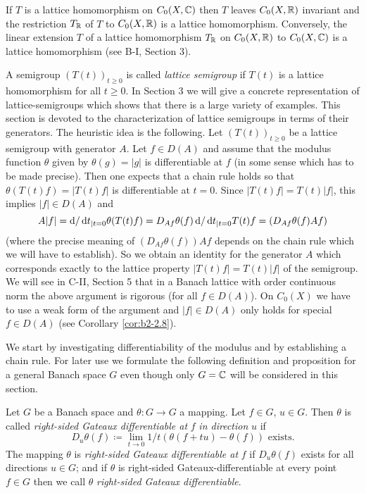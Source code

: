 \begin{remark}\label{rem:b2-2.1}
If $T$ is a lattice homomorphism on $C_{0}(X,\mathbb{C})$ then $T$ leaves $C_{0}(X,\mathbb{R})$ invariant and the restriction $T_{\mathbb{R}}$ of $T$ to $C_{0}(X,\mathbb{R})$ is a lattice homomorphism.
Conversely, the linear extension $T$ of a lattice homomorphism $T_{\mathbb{R}}$ on $C_{0}(X,\mathbb{R})$ to $C_{0}(X,\mathbb{C})$ is a lattice homomorphism (see B-I, Section 3).
\end{remark}

A semigroup $(T(t))_{t \geq 0}$ is called \emph{lattice semigroup} if $T(t)$ is a lattice homomorphism for all $t \geq 0$.
In Section 3 we will give a concrete representation of lattice-semigroups which shows that there is a large variety of examples.
This section is devoted to the characterization of lattice semigroups in terms of their generators.
The heuristic idea is the following.
Let $(T(t))_{t \geq 0}$ be a lattice semigroup with generator $A$.
Let $f \in D(A)$ and assume that the modulus function $\theta$ given by $\theta(g) = |g|$ is differentiable at $f$ (in some sense which has to be made precise).
Then one expects that a chain rule holds so that $\theta(T(t)f) = |T(t)f|$ is differentiable at $t = 0$.
Since $|T(t)f| = T(t)|f|$, this implies $|f| \in D(A)$ and 
\[
A|f| = \mathop{}\!\mathrm{d}{}/\mathop{}\!\mathrm{d}{t}_{|t=0} \theta(T(t)f) = D_{Af}\theta(f)\mathop{}\!\mathrm{d}{/}\mathop{}\!\mathrm{d}{t}_{|t=0}T(t)f = (D_{Af}\theta(f)Af)
\]
 (where the precise meaning of $(D_{Af}\theta(f))Af$  
 depends on the chain rule which we will have to establish).
So we obtain an identity for the generator $A$ which corresponds exactly to the lattice property $|T(t)f| = T(t)|f|$ of the semigroup.
We will see in C-II, Section  5 that in a Banach lattice with order continuous norm the above argument is rigorous (for all $f \in D(A)$).
On $C_{0}(X)$ we have to use a weak form of the argument and $|f| \in D(A)$ only holds for special $f \in D(A)$ (see Corollary  \ref{cor:b2-2.8}).

We start by investigating differentiability of the modulus and by establishing a chain rule.
For later use we formulate the following definition and proposition for a general Banach space $G$ even though only $G = \mathbb{C}$ will be considered in this section.

\begin{definition}\label{def:b2-2.2}
Let $G$ be a Banach space and $\theta \colon G \to G$ a mapping.
Let $f \in G$, $u \in G$.
Then $\theta$ is called \emph{right-sided Gateaux differentiable at} $f$ \emph{in direction} $u$ if
\begin{equation}\label{eq:b2-2.3}
D_{u}\theta(f) \coloneqq \lim_{t \to 0} 1/t(\theta(f+tu) - \theta(f)) \text{ exists.}
\end{equation}
The mapping $\theta$ is \emph{right-sided Gateaux differentiable at} $f$ if $D_{u}\theta(f)$ exists for all directions $u \in G$; and if $\theta$ is right-sided Gateaux-differentiable at every point $f \in G$ then we call $\theta$ \emph{right-sided Gateaux differentiable}.
\end{definition}

